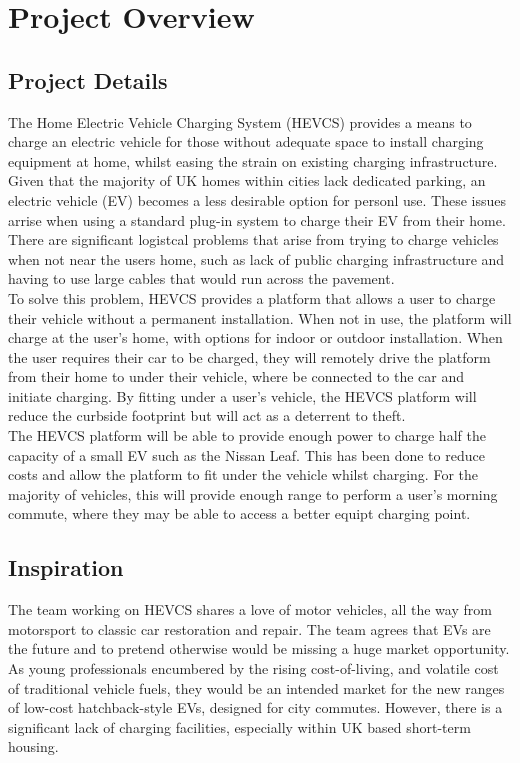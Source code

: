 \documentclass [12pt]{article}
\begin{document}
\section{Project Overview}\label{sec:project_overview}
\subsection{Project Details}\label{sec:project_details}

The Home Electric Vehicle Charging System (HEVCS) provides a means to charge an electric vehicle for those without adequate space to install charging equipment at home, whilst easing the strain on existing charging infrastructure.
Given that the majority of UK homes within cities lack dedicated parking, an electric vehicle (EV) becomes a less desirable option for personl use.
These issues arrise when using a standard plug-in system to charge their EV from their home.
There are significant logistcal problems that arise from trying to charge vehicles when not near the users home, such as lack of public charging infrastructure and having to use large cables that would run across the pavement.
\\
To solve this problem, HEVCS provides a platform that allows a user to charge their vehicle without a permanent installation.
When not in use, the platform will charge at the user's home, with options for indoor or outdoor installation.
When the user requires their car to be charged, they will remotely drive the platform from their home to under their vehicle, where be connected to the car and initiate charging.
By fitting under a user's vehicle, the HEVCS platform will reduce the curbside footprint but will act as a deterrent to theft.
\\
The HEVCS platform will be able to provide enough power to charge half the capacity of a small EV such as the Nissan Leaf.
This has been done to reduce costs and allow the platform to fit under the vehicle whilst charging.
For the majority of vehicles, this will provide enough range to perform a user's morning commute, where they may be able to access a better equipt charging point.

\subsection{Inspiration}\label{sec:inspiration}

The team working on HEVCS shares a love of motor vehicles, all the way from motorsport to classic car restoration and repair.
The team agrees that EVs are the future and to pretend otherwise would be missing a huge market opportunity.
As young professionals encumbered by the rising cost-of-living, and volatile cost of traditional vehicle fuels, they would be an intended market for the new ranges of low-cost hatchback-style EVs, designed for city commutes.
However, there is a significant lack of charging facilities, especially within UK based short-term housing.
\end{document}
